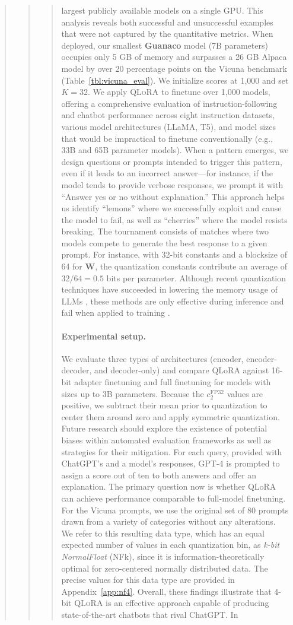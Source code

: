 \begin{quote}
\begin{abstract}
\begin{quote}
largest publicly available models on a single GPU. This analysis reveals both successful and unsuccessful examples that were not captured by the quantitative metrics. When deployed, our smallest \textbf{Guanaco} model (7B parameters) occupies only 5 GB of memory and surpasses a 26 GB Alpaca model by over 20 percentage points on the Vicuna benchmark (Table~\ref{tbl:vicuna_eval}). We initialize scores at 1,000 and set $K=32$. We apply \textsc{QLoRA} to finetune over 1,000 models, offering a comprehensive evaluation of instruction-following and chatbot performance across eight instruction datasets, various model architectures (LLaMA, T5), and model sizes that would be impractical to finetune conventionally (e.g., 33B and 65B parameter models). When a pattern emerges, we design questions or prompts intended to trigger this pattern, even if it leads to an incorrect answer—for instance, if the model tends to provide verbose responses, we prompt it with ``Answer yes or no without explanation.'' This approach helps us identify ``lemons'' where we successfully exploit and cause the model to fail, as well as ``cherries'' where the model resists breaking. The tournament consists of matches where two models compete to generate the best response to a given prompt. For instance, with 32-bit constants and a blocksize of 64 for $\mathbf{W}$, the quantization constants contribute an average of $32/64 = 0.5$ bits per parameter. Although recent quantization techniques have succeeded in lowering the memory usage of LLMs \citep{dettmers2022llm, dettmers2022case, frantar2022gptq, xiao2022smoothquant}, these methods are only effective during inference and fail when applied to training \citep{wortsman2023stable}. \paragraph{Experimental setup.} We evaluate three types of architectures (encoder, encoder-decoder, and decoder-only) and compare QLoRA against 16-bit adapter finetuning and full finetuning for models with sizes up to 3B parameters. Because the $c_2^{\text{FP32}}$ values are positive, we subtract their mean prior to quantization to center them around zero and apply symmetric quantization. Future research should explore the existence of potential biases within automated evaluation frameworks as well as strategies for their mitigation. For each query, provided with ChatGPT’s and a model’s responses, GPT-4 is prompted to assign a score out of ten to both answers and offer an explanation. The primary question now is whether QLoRA can achieve performance comparable to full-model finetuning. For the Vicuna prompts, we use the original set of 80 prompts drawn from a variety of categories without any alterations. We refer to this resulting data type, which has an equal expected number of values in each quantization bin, as \emph{k-bit NormalFloat} (NFk), since it is information-theoretically optimal for zero-centered normally distributed data. The precise values for this data type are provided in Appendix~\ref{app:nf4}. Overall, these findings illustrate that 4-bit \textsc{QLoRA} is an effective approach capable of producing state-of-the-art chatbots that rival ChatGPT. In 
\end{quote}
\end{abstract}
\end{quote}
